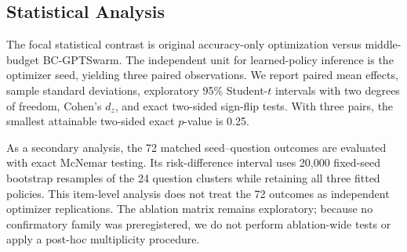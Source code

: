 \subsection{Statistical Analysis}

The focal statistical contrast is original accuracy-only optimization versus middle-budget BC-GPTSwarm. The independent unit for learned-policy inference is the optimizer seed, yielding three paired observations. We report paired mean effects, sample standard deviations, exploratory 95\% Student-$t$ intervals with two degrees of freedom, Cohen's $d_z$, and exact two-sided sign-flip tests. With three pairs, the smallest attainable two-sided exact $p$-value is 0.25.

As a secondary analysis, the 72 matched seed--question outcomes are evaluated with exact McNemar testing. Its risk-difference interval uses 20,000 fixed-seed bootstrap resamples of the 24 question clusters while retaining all three fitted policies. This item-level analysis does not treat the 72 outcomes as independent optimizer replications. The ablation matrix remains exploratory; because no confirmatory family was preregistered, we do not perform ablation-wide tests or apply a post-hoc multiplicity procedure.

